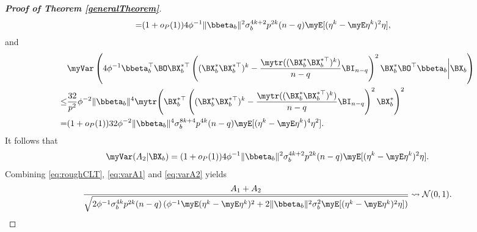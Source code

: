 \begin{proof}[\textbf{Proof of Theorem \ref{generalTheorem}}]
\begin{equation*}
\begin{split}
=&
(1+o_P(1)) 4\phi^{-1} \|\bbeta_b\|^2
\sigma_b^{4k+2} p^{2k} (n-q) \myE [(\eta^k -\myE \eta^k)^2 \eta]
,
    \end{split}
\end{equation*}
and
\begin{equation*}
    \begin{split}
        &
                \myVar\left(
                    4\phi^{-1} \bbeta_b^\top \BO  \BX_b^{*\top}
                    \left( (\BX_b^*  \BX_b^{*\top})^{k} 
                        -\frac{\mytr ( (\BX_b^*  \BX_b^{*\top})^{k})}{n-q} 
                \BI_{n-q}
            \right)^2  \BX_b^* \BO^\top  \bbeta_b
            \bigg| \BX_b
        \right)
        \\
        \leq&
        \frac{32}{p^2} \phi^{-2} \|\bbeta_b\|^4
        \mytr
        \Bigg(
\BX_b^{*\top}
                    \left( (\BX_b^*  \BX_b^{*\top})^{k} 
                        -\frac{\mytr ( (\BX_b^*  \BX_b^{*\top})^{k})}{n-q} 
                \BI_{n-q}
            \right)^2  \BX_b^*
        \Bigg)^2
        \\
        =&
        (1+o_P(1))
        32 \phi^{-2} \|\bbeta_b\|^4
        \sigma_b^{8k + 4} p^{4k} (n-q)
        \myE [(\eta^k - \myE \eta^k)^4 \eta^2]
        .
    \end{split}
\end{equation*}
It follows that
\begin{equation}\label{eq:varA2}
    \myVar (A_2 | \BX_b)= 
        (1+o_P(1))4
        \phi^{-1}
        \|\bbeta_b\|^2
        \sigma_b^{4k+2} p^{2k} (n-q)
        \myE [(\eta^k -\myE \eta^k)^2 \eta]
        .
\end{equation}
Combining \eqref{eq:roughCLT}, \eqref{eq:varA1} and \eqref{eq:varA2} yields
\begin{equation}\label{eq:roughCLT2}
    \frac{
        A_1+A_2
    }{\sqrt{
            2\phi^{-1}
            \sigma_b^{4k} p^{2k}
            (n-q)
            \left( 
                \phi^{-1} \myE (\eta^k - \myE \eta^k)^2
                +
                2\|\bbeta_b\|^2 \sigma_b^2 \myE [(\eta^k - \myE \eta^k)^2\eta]
            \right)
    }} \rightsquigarrow \mathcal N(0,1).
\end{equation}


\end{proof}
